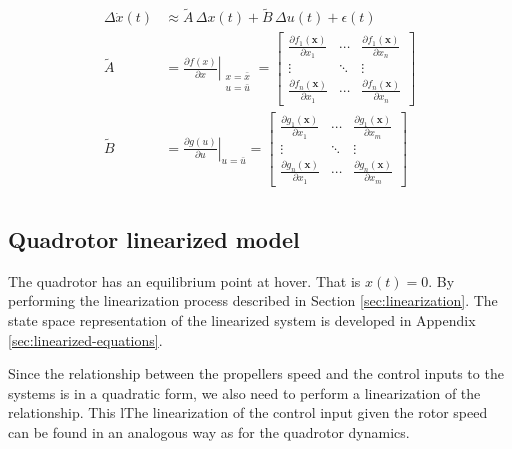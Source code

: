 \documentclass[12pt]{article}
\begin{document}
\begin{equation}
  \begin{split}
    \label{eq:linearization}
    \Delta\dot{x}(t) &\approx  \tilde{A} \, \Delta x(t) + \tilde{B} \, \Delta u(t) + \epsilon (t) \\
    \tilde{A} &= \left. \frac{ \partial f(x)} {\partial x} \right|_{\begin{smallmatrix} x = \bar{x} \\ u = \bar{u} \end{smallmatrix}} = \begin{bmatrix}
    \frac{\partial f_1(\mathbf{x})}{\partial x_1} & \cdots & \frac{\partial f_1(\mathbf{x})}{\partial x_n} \\
    \vdots & \ddots & \vdots \\
    \frac{\partial f_n(\mathbf{x})}{\partial x_1} & \cdots & \frac{\partial f_n(\mathbf{x})}{\partial x_n}
    \end{bmatrix} \\
    \tilde{B} &= \left. \frac{\partial g(u)} {\partial u} \right|_{u = \bar{u}} = \begin{bmatrix}
    \frac{\partial g_1(\mathbf{x})}{\partial x_1} & \cdots & \frac{\partial g_1(\mathbf{x})}{\partial x_m} \\
    \vdots & \ddots & \vdots \\
    \frac{\partial g_n(\mathbf{x})}{\partial x_1} & \cdots & \frac{\partial g_n(\mathbf{x})}{\partial x_m}
    \end{bmatrix} \\
  \end{split}
\end{equation}

\subsection{Quadrotor linearized model}

The quadrotor has an equilibrium point at hover. That is $ x(t) = 0 $. By performing the linearization process described in Section \ref{sec:linearization}. The state space representation of the linearized system is developed in Appendix \ref{sec:linearized-equations}.

Since the relationship between the propellers speed and the control inputs to the systems is in a quadratic form, we also need to perform a linearization of the relationship. This lThe linearization of the control input given the rotor speed can be found in an analogous way as for the quadrotor dynamics.
\end{document}
